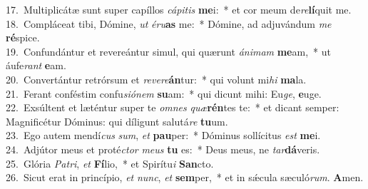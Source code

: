 {17.~}Multiplicátæ sunt super capíllos \textit{cá}\textit{pi}\textit{tis} \textbf{me}i:~* et cor meum de\textit{re}\textbf{lí}quit me.\\
{18.~}Compláceat tibi, Dómine, \textit{ut} \textit{é}\textit{ru}\textbf{as} me:~* Dómine, ad adjuvándum \textit{me} \textbf{ré}spice.\\
{19.~}Confundántur et revereántur simul, qui quærunt \textit{á}\textit{ni}\textit{mam} \textbf{me}am,~* ut áufe\textit{rant} \textbf{e}am.\\
{20.~}Convertántur retrórsum et \textit{re}\textit{ve}\textit{re}\textbf{án}tur:~* qui volunt mi\textit{hi} \textbf{ma}la.\\
{21.~}Ferant conféstim confu\textit{si}\textit{ó}\textit{nem} \textbf{su}am:~* qui dicunt mihi: Eu\textit{ge}, \textbf{e}uge.\\
{22.~}Exsúltent et læténtur super te \textit{om}\textit{nes} \textit{quæ}\textbf{rén}tes te:~* et dicant semper: Magnificétur Dóminus: qui díligunt salutá\textit{re} \textbf{tu}um.\\
{23.~}Ego autem mendí\textit{cus} \textit{sum}, \textit{et} \textbf{pau}per:~* Dóminus sollícitus \textit{est} \textbf{me}i.\\
{24.~}Adjútor meus et proté\textit{ctor} \textit{me}\textit{us} \textbf{tu} es:~* Deus meus, ne \textit{tar}\textbf{dá}veris.\\
{25.~}Glória \textit{Pa}\textit{tri}, \textit{et} \textbf{Fí}lio,~* et Spirítu\textit{i} \textbf{San}cto.\\
{26.~}Sicut erat in princípio, \textit{et} \textit{nunc}, \textit{et} \textbf{sem}per,~* et in sǽcula sæculó\textit{rum}. \textbf{A}men.\\

